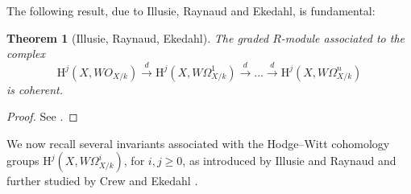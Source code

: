 \documentclass[a4paper,12pt,twoside]{report}
\newtheorem{theorem}{Theorem}[section]
\newcommand{\HH}{\mathrm{H}}
\begin{document}
The following result, due to Illusie, Raynaud and Ekedahl, is fundamental: 

\begin{theorem}[Illusie, Raynaud, Ekedahl]\label{coherent}
    The graded $R$-module associated to the complex
    \begin{equation*}\label{Cplx}
        \HH^j(X,WO_{X/k}) \xrightarrow{d} \HH^j(X,W\Omega^1_{X/k}) \xrightarrow{d} ... \xrightarrow{d} 
        \HH^j(X,W\Omega^n_{X/k})
    \end{equation*} is coherent. 
\end{theorem}

\begin{proof}
    See \cite{IR}.
\end{proof}

We now recall several invariants associated with the Hodge--Witt cohomology groups $\HH^j(X,W\Omega^i_{X/k})$, 
for $i,j\geqslant 0$, as introduced by Illusie and Raynaud \cite{IR} and further studied by Crew \cite{Cr} and Ekedahl \cite{Ek3}. 
\end{document}

